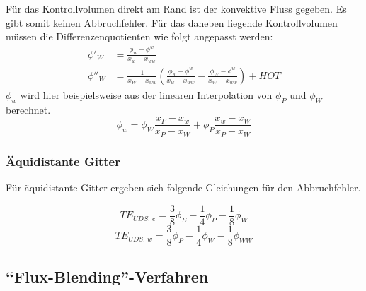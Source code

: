 Für das Kontrollvolumen direkt am Rand ist der konvektive Fluss gegeben. Es gibt somit keinen
Abbruchfehler. Für das daneben liegende Kontrollvolumen müssen die Differenzenquotienten wie folgt angepasst werden:
\begin{align*}
  \phi'_W &= \frac{\phi_w-\phi^w}{x_w-x_{ww}}\\
  \phi''_W &= \frac{1}{x_W-x_{ww}} \left({\frac{\phi_w-\phi^w}{x_w-x_{ww}}
- \frac{\phi_W-\phi^w}{x_W-x_{ww}} }\right)+HOT
\end{align*}
$\phi_w$ wird hier beispielsweise aus der linearen Interpolation von $\phi_P$ und $\phi_W$ berechnet.
\begin{equation*}
  \phi_w = \phi_W \frac{x_P-x_w}{x_P-x_W} + \phi_P \frac{x_w-x_W}{x_P-x_W}
\end{equation*}


\subsubsection{Äquidistante Gitter}

Für äquidistante Gitter ergeben sich folgende Gleichungen für den Abbruchfehler.

\begin{equation*}
  TE_{UDS,\,e} = \frac{3}{8} \phi_E-\frac{1}{4} \phi_P - \frac{1}{8} \phi_W
\end{equation*}
\begin{equation*}
  TE_{UDS,\,w} = \frac{3}{8} \phi_P-\frac{1}{4} \phi_W - \frac{1}{8} \phi_{WW}
\end{equation*}





\subsection{``Flux-Blending''-Verfahren}

